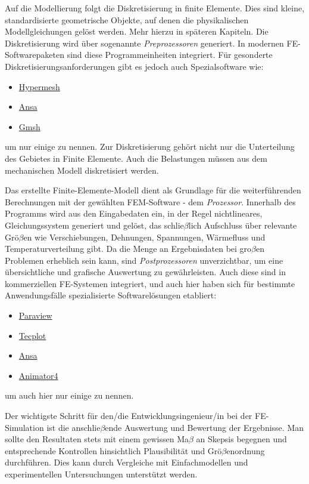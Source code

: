Auf die Modellierung folgt die Diskretisierung in finite Elemente. Dies sind kleine, standardisierte geometrische Objekte, auf denen die physikalischen Modellgleichungen gelöst werden. Mehr hierzu in späteren Kapiteln. Die Diskretisierung wird über sogenannte \textit{Preprozessoren} generiert. In modernen FE-Softwarepaketen sind diese Programmeinheiten integriert. Für gesonderte Diskretisierungsanforderungen gibt es jedoch auch Spezialsoftware wie:

\begin{itemize}
\item \href{https://altair.com/hypermesh/}{Hypermesh}
\item \href{https://www.beta-cae.com/}{Ansa}
\item \href{https://gmsh.info/}{Gmsh}
\end{itemize}

um nur einige zu nennen.
Zur Diskretisierung gehört nicht nur die Unterteilung des Gebietes in Finite Elemente. Auch die Belastungen müssen aus dem mechanischen Modell diskretisiert werden.

Das erstellte Finite-Elemente-Modell dient als Grundlage für die weiterführenden Berechnungen mit der gewählten FEM-Software - dem \textit{Prozessor}. Innerhalb des Programms wird aus den Eingabedaten ein, in der Regel nichtlineares, Gleichungssystem generiert und gelöst, das schlie$\beta$lich Aufschluss über relevante Grö$\beta$en wie Verschiebungen, Dehnungen, Spannungen, Wärmefluss und Temperaturverteilung gibt. Da die Menge an Ergebnisdaten bei gro$\beta$en Problemen erheblich sein kann, sind \textit{Postprozessoren} unverzichtbar, um eine übersichtliche und grafische Auswertung zu gewährleisten. Auch diese sind in kommerziellen FE-Systemen integriert, und auch hier haben sich für bestimmte Anwendungsfälle spezialisierte Softwarelösungen etabliert:

\begin{itemize}
\item \href{https://www.paraview.org/}{Paraview}
\item \href{https://tecplot.com/}{Tecplot}
\item \href{https://www.beta-cae.com/}{Ansa}
\item \href{https://www.gns-mbh.com/products/animator4/}{Animator4}
\end{itemize}

um auch hier nur einige zu nennen.

Der wichtigste Schritt für den/die Entwicklungsingenieur/in bei der FE-Simulation ist die anschlie$\beta$ende Auswertung und Bewertung der Ergebnisse. Man sollte den Resultaten stets mit einem gewissen Ma$\beta$ an Skepsis begegnen und entsprechende Kontrollen hinsichtlich Plausibilität und Grö$\beta$enordnung durchführen. Dies kann durch Vergleiche mit Einfachmodellen und experimentellen Untersuchungen unterstützt werden.

